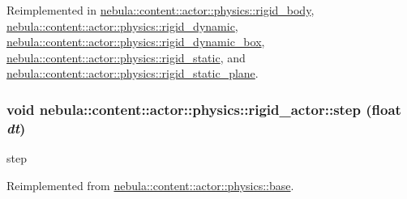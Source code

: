 Reimplemented in \hyperlink{classnebula_1_1content_1_1actor_1_1physics_1_1rigid__body_a99b70594f437d666ec7ee33e4d36c964}{nebula::content::actor::physics::rigid\_\-body}, \hyperlink{classnebula_1_1content_1_1actor_1_1physics_1_1rigid__dynamic_a712d45c781944f79af0d074062674e20}{nebula::content::actor::physics::rigid\_\-dynamic}, \hyperlink{classnebula_1_1content_1_1actor_1_1physics_1_1rigid__dynamic__box_a3f9abbce238ad6bee7363ab9a849512c}{nebula::content::actor::physics::rigid\_\-dynamic\_\-box}, \hyperlink{classnebula_1_1content_1_1actor_1_1physics_1_1rigid__static_acbf24424c29fa78f568f67fe80cee108}{nebula::content::actor::physics::rigid\_\-static}, and \hyperlink{classnebula_1_1content_1_1actor_1_1physics_1_1rigid__static__plane_a2ccd43a02a417f4690bc9174e4bf533a}{nebula::content::actor::physics::rigid\_\-static\_\-plane}.\hypertarget{classnebula_1_1content_1_1actor_1_1physics_1_1rigid__actor_a8d53c36044b639537cecff87ef9f84f1}{
\subsubsection[{step}]{\setlength{\rightskip}{0pt plus 5cm}void nebula::content::actor::physics::rigid\_\-actor::step (float {\em dt})}}
\label{classnebula_1_1content_1_1actor_1_1physics_1_1rigid__actor_a8d53c36044b639537cecff87ef9f84f1}


step 

Reimplemented from \hyperlink{classnebula_1_1content_1_1actor_1_1physics_1_1base_aac025359e301532039709ea8697bb29f}{nebula::content::actor::physics::base}.

